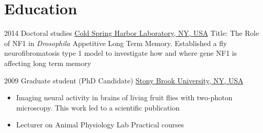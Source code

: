 \documentclass[a4paper]{twentysecondcv} %
\begin{document}


\section{Education}
		{2014 \hspace{5mm}}
        {Doctoral studies}
        {\href{http://www.cshl.edu/}{Cold Spring Harbor Laboratory, NY, USA}}
        { }
        {
        \vspace{0.5mm}
        Title: The Role of NF1 in \textit{Drosophila} Appetitive Long Term Memory.
            Established a fly neurofibromatosis type 1 model to investigate how and where gene NF1 is affecting long term memory
        }



		{2009 \hspace{5mm}}
        {Graduate student (PhD Candidate)}
        {\href{http://www.stonybrook.edu/}{Stony Brook University, NY, USA}}
        { }
        {
        \begin{itemize}
            \item Imaging neural activity in brains of living fruit flies with two-photon microscopy. 
                  This work led to a scientific publication
            \item Lecturer on Animal Physiology Lab Practical courses
        \end{itemize}
    	}
\end{document}
